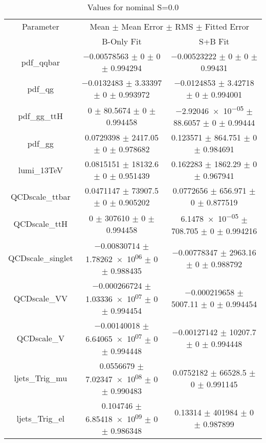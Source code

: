 \begin{table}
\centering
\caption{Values for nominal S=0.0}
\begin{tabular}{ccc}
\toprule
Parameter & \multicolumn{2}{c}{Mean $\pm$ Mean Error $\pm$ RMS $\pm$ Fitted Error}\\
 & B-Only Fit & S+B Fit\\
\midrule
pdf\_qqbar & \num{-0.00578563} $\pm$ \num{0} $\pm$ \num{0} $\pm$ \num{0.994294} & \num{-0.00523222} $\pm$ \num{0} $\pm$ \num{0} $\pm$ \num{0.99431}\\
pdf\_qg & \num{-0.0132483} $\pm$ \num{3.33397} $\pm$ \num{0} $\pm$ \num{0.993972} & \num{-0.0124853} $\pm$ \num{3.42718} $\pm$ \num{0} $\pm$ \num{0.994001}\\
pdf\_gg\_ttH & \num{0} $\pm$ \num{80.5674} $\pm$ \num{0} $\pm$ \num{0.994458} & \num{-2.92046e-05} $\pm$ \num{88.6057} $\pm$ \num{0} $\pm$ \num{0.99444}\\
pdf\_gg & \num{0.0729398} $\pm$ \num{2417.05} $\pm$ \num{0} $\pm$ \num{0.978682} & \num{0.123571} $\pm$ \num{864.751} $\pm$ \num{0} $\pm$ \num{0.984691}\\
lumi\_13TeV & \num{0.0815151} $\pm$ \num{18132.6} $\pm$ \num{0} $\pm$ \num{0.951439} & \num{0.162283} $\pm$ \num{1862.29} $\pm$ \num{0} $\pm$ \num{0.967941}\\
QCDscale\_ttbar & \num{0.0471147} $\pm$ \num{73907.5} $\pm$ \num{0} $\pm$ \num{0.905202} & \num{0.0772656} $\pm$ \num{656.971} $\pm$ \num{0} $\pm$ \num{0.877519}\\
QCDscale\_ttH & \num{0} $\pm$ \num{307610} $\pm$ \num{0} $\pm$ \num{0.994458} & \num{6.1478e-05} $\pm$ \num{708.705} $\pm$ \num{0} $\pm$ \num{0.994216}\\
QCDscale\_singlet & \num{-0.00830714} $\pm$ \num{1.78262e+06} $\pm$ \num{0} $\pm$ \num{0.988435} & \num{-0.00778347} $\pm$ \num{2963.16} $\pm$ \num{0} $\pm$ \num{0.988792}\\
QCDscale\_VV & \num{-0.000266724} $\pm$ \num{1.03336e+07} $\pm$ \num{0} $\pm$ \num{0.994454} & \num{-0.000219658} $\pm$ \num{5007.11} $\pm$ \num{0} $\pm$ \num{0.994454}\\
QCDscale\_V & \num{-0.00140018} $\pm$ \num{6.64065e+07} $\pm$ \num{0} $\pm$ \num{0.994448} & \num{-0.00127142} $\pm$ \num{10207.7} $\pm$ \num{0} $\pm$ \num{0.994448}\\
ljets\_Trig\_mu & \num{0.0556679} $\pm$ \num{7.02347e+08} $\pm$ \num{0} $\pm$ \num{0.990483} & \num{0.0752182} $\pm$ \num{66528.5} $\pm$ \num{0} $\pm$ \num{0.991145}\\
ljets\_Trig\_el & \num{0.104746} $\pm$ \num{6.85418e+09} $\pm$ \num{0} $\pm$ \num{0.986348} & \num{0.13314} $\pm$ \num{401984} $\pm$ \num{0} $\pm$ \num{0.987899}\\

\end{tabular}
\end{table}
